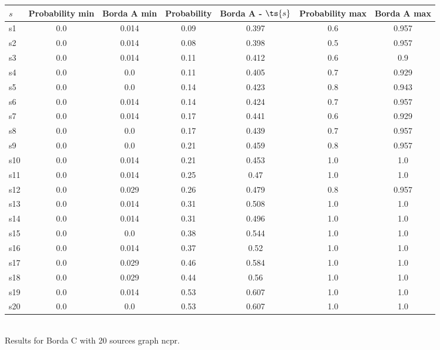 \documentclass{article}
\begin{document}
\noindent\begin{tabular}{|l|c|c|c|c|c|c|}
\hline
$s$& Probability min & Borda A min & Probability & Borda A - $\ts{s}$ & Probability max & Borda A max\\
\hline
s1 &0.0 & 0.014 & 0.09 & 0.397 & 0.6 & 0.957\\
\hline
s2 &0.0 & 0.014 & 0.08 & 0.398 & 0.5 & 0.957\\
\hline
s3 &0.0 & 0.014 & 0.11 & 0.412 & 0.6 & 0.9\\
\hline
s4 &0.0 & 0.0 & 0.11 & 0.405 & 0.7 & 0.929\\
\hline
s5 &0.0 & 0.0 & 0.14 & 0.423 & 0.8 & 0.943\\
\hline
s6 &0.0 & 0.014 & 0.14 & 0.424 & 0.7 & 0.957\\
\hline
s7 &0.0 & 0.014 & 0.17 & 0.441 & 0.6 & 0.929\\
\hline
s8 &0.0 & 0.0 & 0.17 & 0.439 & 0.7 & 0.957\\
\hline
s9 &0.0 & 0.0 & 0.21 & 0.459 & 0.8 & 0.957\\
\hline
s10 &0.0 & 0.014 & 0.21 & 0.453 & 1.0 & 1.0\\
\hline
s11 &0.0 & 0.014 & 0.25 & 0.47 & 1.0 & 1.0\\
\hline
s12 &0.0 & 0.029 & 0.26 & 0.479 & 0.8 & 0.957\\
\hline
s13 &0.0 & 0.014 & 0.31 & 0.508 & 1.0 & 1.0\\
\hline
s14 &0.0 & 0.014 & 0.31 & 0.496 & 1.0 & 1.0\\
\hline
s15 &0.0 & 0.0 & 0.38 & 0.544 & 1.0 & 1.0\\
\hline
s16 &0.0 & 0.014 & 0.37 & 0.52 & 1.0 & 1.0\\
\hline
s17 &0.0 & 0.029 & 0.46 & 0.584 & 1.0 & 1.0\\
\hline
s18 &0.0 & 0.029 & 0.44 & 0.56 & 1.0 & 1.0\\
\hline
s19 &0.0 & 0.014 & 0.53 & 0.607 & 1.0 & 1.0\\
\hline
s20 &0.0 & 0.0 & 0.53 & 0.607 & 1.0 & 1.0\\
\hline
\end{tabular}\\

\noindent Results for Borda C with 20 sources graph ncpr.
\end{document}
